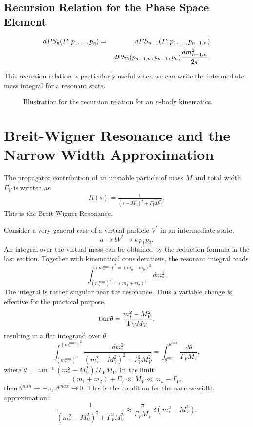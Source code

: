 \documentclass[12pt,prd,aps,floats,preprintnumbers,preprint,superscriptaddress,floatfix,nofootinbib]{revtex4}
\def\be{\begin{equation}}
\def\ee{\end{equation}}
\def\bea{\begin{eqnarray}}
\def\eea{\end{eqnarray}}
\begin{document}
\subsection{Recursion Relation for the Phase Space Element}
\label{rec}
\bea
\nonumber
dPS_n(P; p_1,...,p_n) &=& dPS_{n-1}(P; p_1,...,p_{n-1,n}) \\
                    && dPS_2(p_{n-1,n}; p_{n-1},p_n) {dm^2_{n-1,n}\over 2\pi}.
\eea

This recursion relation is particularly useful when we can write the intermediate 
mass integral for a resonant state. 

\begin{center}
\begin{figure}[tb]
\caption{Illustration for the recursion relation for an $n$-body kinematics.
\label{fig:p}}
\end{figure}
\end{center}

\section{Breit-Wigner Resonance and the Narrow Width Approximation}
\label{sec:BW}

The propagator contribution of an unstable particle of mass $M$ and total width 
$\Gamma_V$ is written as 
\bea
R(s) = \frac{1}{ (s-M^2_V)^2 + \Gamma_V^2 M_V^2} ,
\label{BW}
\eea 
This is the Breit-Wigner Resonance. 

Consider a very general case of a virtual particle $V^*$ 
in an intermediate state, 
\be
a \to b V^* \to b\ p_1 p_2.
\ee
An integral over the virtual mass can be obtained by the reduction
formula in the last section. Together with kinematical considerations, 
the resonant integral reads
\be
\int_{(m^{min}_*)^2=(m_1+m_2)^2}^{(m^{max}_*)^2=(m_a-m_b)^2}
 {dm_*^2}.
\ee
The integral is rather singular near the resonance. Thus a variable
change is effective for the practical purpose,
\be
\tan\theta ={ {m_*^2 - M_V^2}\over {\Gamma_V M_V} },
\ee
resulting in a flat integrand over $\theta$
\be
\int_{(m^{min}_*)^2}^{(m^{max}_*)^2}
\frac{dm_*^2}{ (m^2_* - M^2_V)^2 + \Gamma_V^2 M_V^2} 
= \int_{\theta^{min}}^{\theta^{max}} \frac{d\theta }{\Gamma_V M_V} ,
\ee
where $\theta = \tan^{-1}(m_*^2 - M_V^2)/ \Gamma_V M_V$.
In the limit 
\be
(m_1+m_2)+\Gamma_V \ll M_V  \ll m_a - \Gamma_V,
\ee
then $\theta^{min} \to -\pi,\ \theta^{max}\to 0$.
This is the condition for the narrow-width approximation:
\be
\frac{ 1 }{ (m^2_* - M^2_V)^2 + \Gamma_V^2 M_V^2} \approx 
\frac{ \pi }{\Gamma_V M_V}\ \delta(m^2_* - M^2_V).
\ee
 
\end{document}
